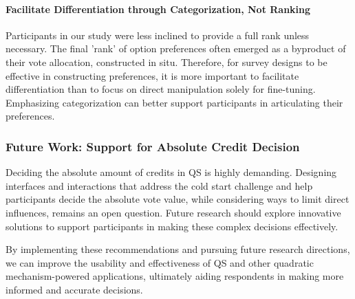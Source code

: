 \paragraph{Facilitate Differentiation through Categorization, Not Ranking}
Participants in our study were less inclined to provide a full rank unless necessary. The final 'rank' of option preferences often emerged as a byproduct of their vote allocation, constructed in situ. Therefore, for survey designs to be effective in constructing preferences, it is more important to facilitate differentiation than to focus on direct manipulation solely for fine-tuning. Emphasizing categorization can better support participants in articulating their preferences.

\subsubsection{Future Work: Support for Absolute Credit Decision}
Deciding the absolute amount of credits in QS is highly demanding. Designing interfaces and interactions that address the cold start challenge and help participants decide the absolute vote value, while considering ways to limit direct influences, remains an open question. Future research should explore innovative solutions to support participants in making these complex decisions effectively.

By implementing these recommendations and pursuing future research directions, we can improve the usability and effectiveness of QS and other quadratic mechanism-powered applications, ultimately aiding respondents in making more informed and accurate decisions.






